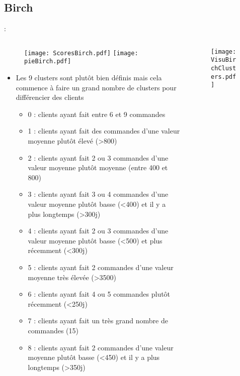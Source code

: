 \documentclass[8pt,aspectratio=169,hyperref={unicode=true}]{beamer}
\begin{document}
\subsection{Birch}
\begin{frame}{\insertsection: \insertsubsection}
    \begin{columns}
        \begin{column}{.55\textwidth}
            \begin{figure}
                \hfill
                \texttt{[image: ScoresBirch.pdf]}
                \hfill
                \texttt{[image: pieBirch.pdf]}
                \hfill
            \end{figure}
            \begin{itemize}
                \footnotesize
                \item Les 9 clusters sont plutôt bien définis mais cela commence à faire un grand nombre de clusters pour différencier des clients
                      \begin{itemize}
                          \scriptsize
                          \item 0 : clients ayant fait entre 6 et 9 commandes
                          \item 1 : clients ayant fait des commandes d'une valeur moyenne plutôt élevé (>800)
                          \item 2 : clients ayant fait 2 ou 3 commandes d'une valeur moyenne plutôt moyenne (entre 400 et 800)
                          \item 3 : clients ayant fait 3 ou 4 commandes d'une valeur moyenne plutôt basse (<400) et il y a plus longtemps (>300j)
                          \item 4 : clients ayant fait 2 ou 3 commandes d'une valeur moyenne plutôt basse (<500) et plus récemment (<300j)
                          \item 5 : clients ayant fait 2 commandes d'une valeur moyenne très élevée (>3500)
                          \item 6 : clients ayant fait 4 ou 5 commandes plutôt récemment (<250j)
                          \item 7 : clients ayant fait un très grand nombre de commandes (15)
                          \item 8 : clients ayant fait 2 commandes d'une valeur moyenne plutôt basse (<450) et il y a plus longtemps (>350j)
                      \end{itemize}
            \end{itemize}
        \end{column}
        \begin{column}{.45\textwidth}
            \begin{figure}
                \texttt{[image: VisuBirchClusters.pdf]}
            \end{figure}
        \end{column}
    \end{columns}
\end{frame}
\end{document}
